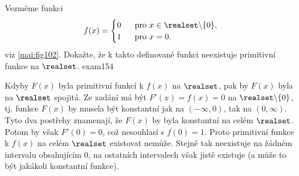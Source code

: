 \begin{mathexam}{Vezměme funkci 
  \begin{equation*}
    f(x) = 
    \begin{cases}
       0 & \text{pro} x\in\realset\backslash \{0\}, \\
       1 & \text{pro} x=0.
   \end{cases}
  \end{equation*}
  viz \ref{mai:fig102}. Dokažte, že k takto definované funkci neexistuje primitivní funkce na
  \(\realset\).
  }{exam154} 

  {\centering
    \captionsetup{type=figure} 
    \label{mai:fig102}
  \par}
  
  Kdyby \(F(x)\) byla primitivní funkcí k \(f(x)\) na \(\realset\), pak by \(F(x)\) byla na
  \(\realset\) spojitá. Ze zadání má být \(F'(x) = f(x) = 0\) na \(\realset\backslash \{0\}\), tj.
  funkce \(F(x)\) by musela být konstantní jak na \((−\infty, 0)\), tak na \((0, ∞)\). Tyto dva
  postřehy znamenají, že \(F(x)\) by byla konstantní na celém \(\realset\). Potom by však \(F'(0) =
  0\), což nesouhlasí s \(f(0) = 1\). Proto primitivní funkce k \(f(x)\) na celém \(\realset\)
  existovat nemůže. Stejně tak neexistuje na žádném intervalu obsahujícím \(0\), na ostatních
  intervalech však jistě existuje (a může to být jakákoli konstantní funkce).
\end{mathexam}